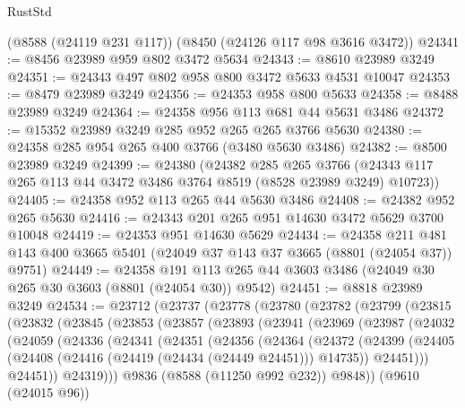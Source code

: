 \begin{lexlean}{RustStd}
\begin{coremodule}
    (@8588 (@24119 @231 @117))
    (@8450 (@24126 @117 @98 @3616 @3472))
@24341 := @8456 @23989 @959 @802 @3472 @5634
@24343 := @8610 @23989 @3249
@24351 := @24343 @497 @802 @958 @800 @3472 @5633 @4531 @10047
@24353 := @8479 @23989 @3249
@24356 := @24353 @958 @800 @5633
@24358 := @8488 @23989 @3249
@24364 := @24358 @956 @113 @681 @44 @5631 @3486
@24372 := @15352 @23989 @3249 @285 @952 @265 @265 @3766 @5630
@24380 := @24358 @285 @954 @265 @400 @3766 (@3480 @5630 @3486)
@24382 := @8500 @23989 @3249
@24399 := @24380
    (@24382
      @285
      @265
      @3766
      (@24343 @117 @265 @113 @44 @3472 @3486 @3764 @8519 (@8528 @23989 @3249) @10723))
@24405 := @24358 @952 @113 @265 @44 @5630 @3486
@24408 := @24382 @952 @265 @5630
@24416 := @24343 @201 @265 @951 @14630 @3472 @5629 @3700 @10048
@24419 := @24353 @951 @14630 @5629
@24434 := @24358
    @211
    @481
    @143
    @400
    @3665
    @5401
    (@24049 @37 @143 @37 @3665 (@8801 (@24054 @37)) @9751)
@24449 := @24358
    @191
    @113
    @265
    @44
    @3603
    @3486
    (@24049 @30 @265 @30 @3603 (@8801 (@24054 @30)) @9542)
@24451 := @8818 @23989 @3249
@24534 := @23712
    (@23737
      (@23778
        (@23780
          (@23782
            (@23799
              (@23815
                (@23832
                  (@23845
                    (@23853
                      (@23857
                        (@23893
                          (@23941
                            (@23969
                              (@23987
                                (@24032
                                  (@24059
                                    (@24336
                                      (@24341
                                        (@24351
                                          (@24356
                                            (@24364
                                              (@24372
                                                (@24399
                                                  (@24405
                                                    (@24408
                                                      (@24416
                                                        (@24419 (@24434 (@24449 @24451)))
                                                        @14735))
                                                    @24451)))
                                              @24451))
                                          @24319)))
                                    @9836
                                    (@8588 (@11250 @992 @232))
                                    @9848))
                                (@9610 (@24015 @96))

\end{coremodule}
\end{lexlean}
